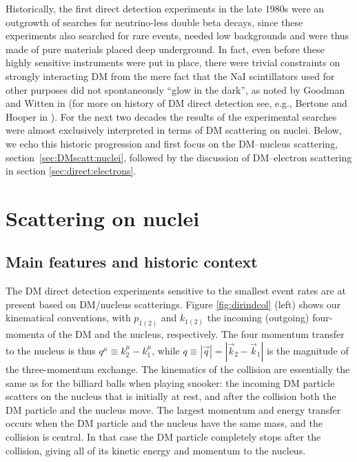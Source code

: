 \smallskip

Historically, the first direct detection experiments in the late 1980s were an outgrowth of searches for neutrino-less double beta decays, since these experiments also searched for rare events, needed low backgrounds and were thus made of pure materials placed deep underground.  
In fact, even before these highly sensitive instruments were put in place, there were trivial constraints on strongly interacting DM from the mere fact that the NaI scintillators used for other purposes did not spontaneously ``glow in the dark'', as noted by Goodman and Witten in  \cite{DM:nucleon:superconductors} (for more on history of DM direct detection see, e.g., Bertone and Hooper in \cite{otherpastDMreviews}).
For the next two decades the results of the experimental searches were almost exclusively interpreted in terms of DM scattering on nuclei. Below, we echo this historic progression and first focus on the DM--nucleus scattering, section~\ref{sec:DMscatt:nuclei}, followed by the discussion of DM--electron scattering in section \ref{sec:direct:electrons}. 


\section{Scattering on nuclei}
\label{sec:DMscatt:nuclei}
\subsection{Main features and historic context}
The DM direct detection experiments sensitive to the smallest event rates are at present based on DM/nucleus scatterings.
Figure \ref{fig:dirindcol} (left) shows our kinematical conventions, 
with $p_{1(2)}$ and $k_{1(2)}$ the incoming (outgoing) four-momenta of the DM and the nucleus, respectively. The four momentum transfer to the nucleus is thus $q^\mu\equiv k_2^\mu-k_1^\mu$, while $q\equiv|\vec q|=|\vec k_2-\vec k_1|$ is the magnitude of the three-momentum exchange.  The kinematics of the collision are essentially the same as for the billiard balls when playing snooker: the incoming DM particle scatters on the nucleus that is initially at rest, 
and after the collision both the DM particle and the nucleus move. The largest momentum and energy transfer occurs when the DM particle and the nucleus have the same mass, and the collision is central. In that case the DM particle completely stops after the collision, giving all of its kinetic energy and momentum to the nucleus. 

